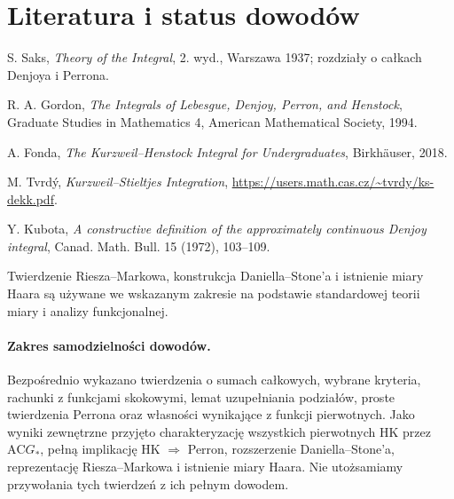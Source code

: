 \documentclass[11pt,a4paper]{article}
\numberwithin{equation}{section}
\theoremstyle{plain}
\theoremstyle{definition}
\theoremstyle{remark}
\newcommand{\AC}{\mathrm{AC}}
\begin{document}
\section*{Literatura i status dowodów}
\begin{enumerate}[label={[\arabic*]},leftmargin=*]
\item S. Saks, \emph{Theory of the Integral}, 2. wyd., Warszawa 1937; rozdziały o całkach Denjoya i Perrona.
\item R. A. Gordon, \emph{The Integrals of Lebesgue, Denjoy, Perron, and Henstock}, Graduate Studies in Mathematics 4, American Mathematical Society, 1994.
\item A. Fonda, \emph{The Kurzweil--Henstock Integral for Undergraduates}, Birkh\"{a}user, 2018.
\item M. Tvrd\'{y}, \emph{Kurzweil--Stieltjes Integration}, \url{https://users.math.cas.cz/~tvrdy/ks-dekk.pdf}.
\item Y. Kubota, \emph{A constructive definition of the approximately continuous Denjoy integral}, Canad. Math. Bull. 15 (1972), 103--109.
\item Twierdzenie Riesza--Markowa, konstrukcja Daniella--Stone'a i istnienie miary Haara są używane we wskazanym zakresie na podstawie standardowej teorii miary i analizy funkcjonalnej.
\end{enumerate}

\paragraph*{Zakres samodzielności dowodów.}
Bezpośrednio wykazano twierdzenia o sumach całkowych, wybrane kryteria, rachunki z funkcjami skokowymi, lemat uzupełniania podziałów, proste twierdzenia Perrona oraz własności wynikające z funkcji pierwotnych. Jako wyniki zewnętrzne przyjęto charakteryzację wszystkich pierwotnych HK przez $\AC G_*$, pełną implikację HK $\Rightarrow$ Perron, rozszerzenie Daniella--Stone'a, reprezentację Riesza--Markowa i istnienie miary Haara. Nie utożsamiamy przywołania tych twierdzeń z ich pełnym dowodem.
\end{document}
